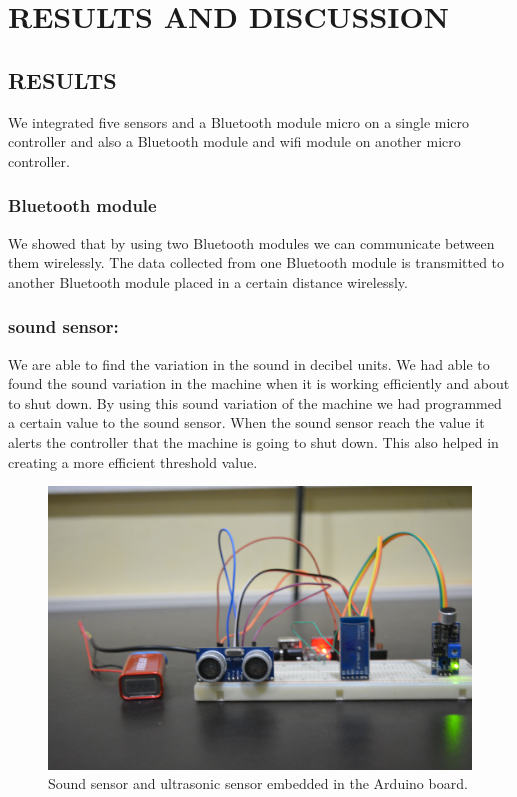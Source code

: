 \chapter{RESULTS AND DISCUSSION}
\section{RESULTS}
We integrated five sensors and a Bluetooth module micro on a single micro controller and also a Bluetooth module and wifi module on another micro controller.
\subsection{Bluetooth module}
We showed that by using two Bluetooth modules we can communicate between them wirelessly. The data collected from one Bluetooth module is transmitted to another Bluetooth module placed in a certain distance wirelessly.
\subsection{sound sensor:}
We are able to find the variation in the sound in decibel units. We had able to found the sound variation in the machine when it is working efficiently and about to shut down. By using this sound variation of the machine we had programmed a certain value to the sound sensor. When the sound sensor reach the value it alerts the controller that the machine is going to shut down. This also helped in creating a more efficient threshold value.


\newpage
\begin{figure}[h]
\centerline{\includegraphics[width=5.7in]{uc}}
\caption{ Sound sensor and ultrasonic sensor embedded in the Arduino board.}
\end{figure}
